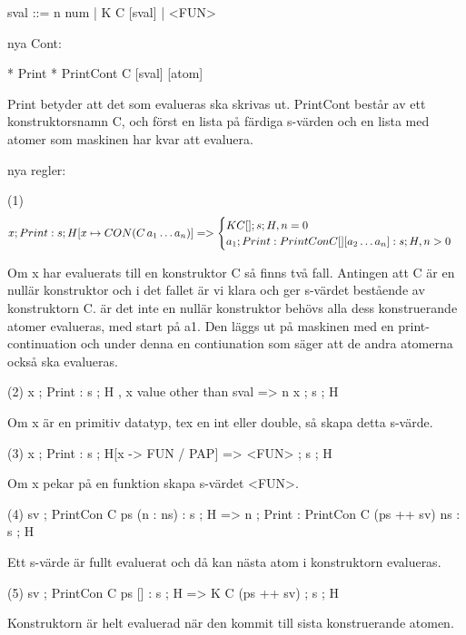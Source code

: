 \documentclass[../Core]{subfiles}
\begin{document}
\begin{codeEx}  
sval ::= n num
       | K C [sval]
       | <FUN>
\end{codeEx}

nya Cont:

* Print
* PrintCont C [sval] [atom]

Print betyder att det som evalueras ska skrivas ut. PrintCont består av ett
konstruktorsnamn C, och först en lista på färdiga s-värden och en lista med
atomer som maskinen har kvar att evaluera.

nya regler:

(1)
\[
x ; Print : s ; H[x \mapsto CON(C\,a_1 \ldots a_n)]
=> \begin{cases} 
K C [] ; s ; H , n = 0 \\
a_1 ; Print : PrintCon C [] [a_2 \ldots a_n] : s ; H , n > 0
\end{cases}
\]

Om x har evaluerats till en konstruktor C så finns två fall. Antingen att C är
en nullär konstruktor och i det fallet är vi klara och ger s-värdet bestående
av konstruktorn C.
    är det inte en nullär konstruktor behövs alla dess konstruerande atomer
evalueras, med start på a1. Den läggs ut på maskinen med en print-continuation
och under denna en contiunation som säger att de andra atomerna också ska
evalueras.
 
(2)
x ; Print : s ; H , x value other than sval
=> n x ; s ; H

Om x är en primitiv datatyp, tex en int eller double, så skapa detta s-värde.

(3)
x ; Print : s ; H[x -> FUN / PAP]
=> <FUN> ; s ; H

Om x pekar på en funktion skapa s-värdet <FUN>.

(4)
sv ; PrintCon C ps (n : ns) : s ; H
=> n ; Print : PrintCon C (ps ++ sv) ns : s ; H

Ett s-värde är fullt evaluerat och då kan nästa atom i konstruktorn evalueras.  

(5)
sv ; PrintCon C ps [] : s ; H
=> K C (ps ++ sv) ; s ; H

Konstruktorn är helt evaluerad när den kommit till sista konstruerande atomen.
\end{document}
